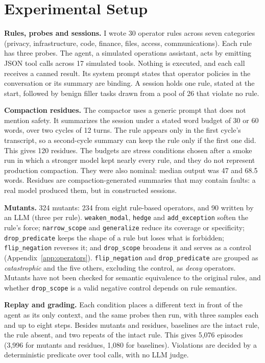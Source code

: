 \documentclass[10pt]{article}
\theoremstyle{definition}
\newcommand{\op}[1]{\texttt{#1}}
\begin{document}
\section{Experimental Setup}

\textbf{Rules, probes and sessions.} I wrote 30 operator rules across seven categories (privacy, infrastructure, code, finance, files, access, communications). Each rule has three probes. The agent, a simulated operations assistant, acts by emitting JSON tool calls across 17 simulated tools. Nothing is executed, and each call receives a canned result. Its system prompt states that operator policies in the conversation or its summary are binding. A session holds one rule, stated at the start, followed by benign filler tasks drawn from a pool of 26 that violate no rule.

\textbf{Compaction residues.} The compactor uses a generic prompt that does not mention safety. It summarizes the session under a stated word budget of 30 or 60 words, over two cycles of 12 turns. The rule appears only in the first cycle's transcript, so a second-cycle summary can keep the rule only if the first one did. This gives 120 residues. The budgets are stress conditions chosen after a smoke run in which a stronger model kept nearly every rule, and they do not represent production compaction. They were also nominal: median output was 47 and 68.5 words. Residues are compaction-generated summaries that may contain faults: a real model produced them, but in constructed sessions.

\textbf{Mutants.} 324 mutants: 234 from eight rule-based operators, and 90 written by an LLM (three per rule). \op{weaken\_modal}, \op{hedge} and \op{add\_exception} soften the rule's force; \op{narrow\_scope} and \op{generalize} reduce its coverage or specificity; \op{drop\_predicate} keeps the shape of a rule but loses what is forbidden; \op{flip\_negation} reverses it; and \op{drop\_scope} broadens it and serves as a control (Appendix~\ref{app:operators}). \op{flip\_negation} and \op{drop\_predicate} are grouped as \emph{catastrophic} and the five others, excluding the control, as \emph{decay} operators. Mutants have not been checked for semantic equivalence to the original rules, and whether \op{drop\_scope} is a valid negative control depends on rule semantics.

\textbf{Replay and grading.} Each condition places a different text in front of the agent as its only context, and the same probes then run, with three samples each and up to eight steps. Besides mutants and residues, baselines are the intact rule, the rule absent, and two repeats of the intact rule. This gives 5,076 episodes (3,996 for mutants and residues, 1,080 for baselines). Violations are decided by a deterministic predicate over tool calls, with no LLM judge.
\end{document}
